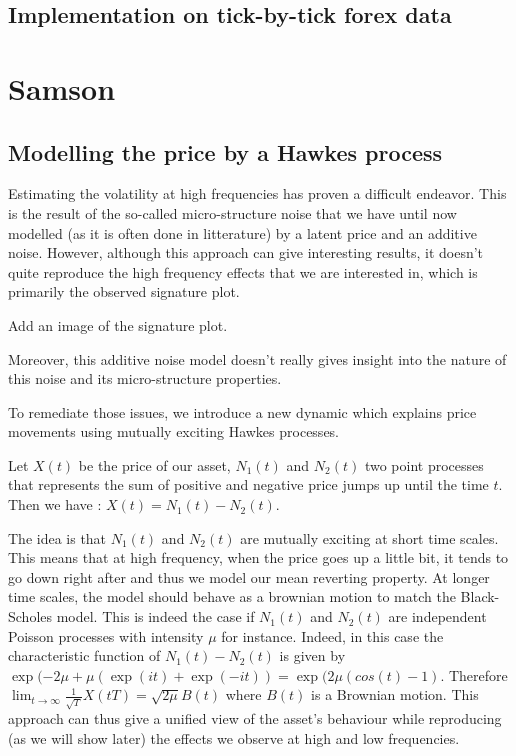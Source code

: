 \documentclass[a4paper,12pt,twoside]{article}
\begin{document}
\subsection{Implementation on tick-by-tick forex data}


\section{Samson} \label{section-samson}
\subsection{Modelling the price by a Hawkes process}

Estimating the volatility at high frequencies has proven a difficult endeavor. This is the result of the so-called micro-structure noise that we have until now modelled (as it is often done in litterature) by a latent price and an additive noise. 
However, although this approach can give interesting results, it doesn't quite reproduce the high frequency effects that we are interested in, which is primarily the observed signature plot. 

Add an image of the signature plot.

Moreover, this additive noise model doesn't really gives insight into the nature of this noise and its micro-structure properties. 

To remediate those issues, we introduce a new dynamic which explains price movements using mutually exciting Hawkes processes.

Let $X(t)$ be the price of our asset, $N_1(t)$ and $N_2(t)$ two point processes that represents the sum of positive and negative price jumps up until the time $t$. Then we have : $X(t) = N_1(t) - N_2(t)$. 

The idea is that $N_1(t)$ and $N_2(t)$ are mutually exciting at short time scales. This means that at high frequency, when the price goes up a little bit, it tends to go down right after and thus we model our mean reverting property. At longer time scales, the model should behave as a brownian motion to match the Black-Scholes model. This is indeed the case if $N_1(t)$ and $N_2(t)$ are independent Poisson processes with intensity $\mu$ for instance.
Indeed, in this case the characteristic function of $N_1(t) - N_2(t)$ is given by $\exp(-2\mu + \mu(\exp(it) + \exp(-it)) = \exp(2\mu(cos(t) - 1)$. Therefore $\lim_{t \to \infty} \frac{1}{\sqrt{T}}X(tT) = \sqrt{2\mu}B(t)$ where $B(t)$ is a Brownian motion.
This approach can thus give a unified view of the asset's behaviour while reproducing (as we will show later) the effects we observe at high and low frequencies.
\end{document}
